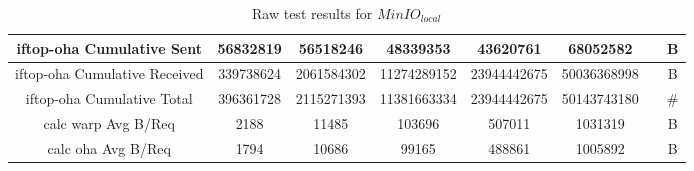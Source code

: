 \begin{sidewaystable}
\begin{tabular}{|c|c|c|c|c|c|c|c|}
		\hline
		iftop-oha Cumulative Sent & 56832819 & 56518246 & 48339353 & 43620761 & 68052582 &  & B \\
		\hline
		iftop-oha Cumulative Received & 339738624 & 2061584302 & 11274289152 & 23944442675 & 50036368998 &  & B \\
		\hline
		iftop-oha Cumulative Total & 396361728 & 2115271393 & 11381663334 & 23944442675 & 50143743180 &  & \# \\
		\hline
		calc warp Avg B/Req & 2188 & 11485 & 103696 & 507011 & 1031319 &  & B \\
		\hline
		calc oha Avg B/Req & 1794 & 10686 & 99165 & 488861 & 1005892 &  & B \\
		\hline
	\end{tabular}
	\caption{Raw test results for ${MinIO}_{local}$}
\end{sidewaystable}

